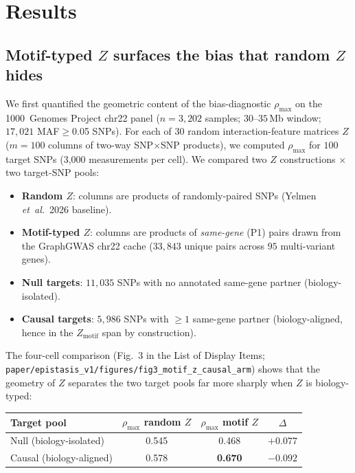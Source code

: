 \section{Results}\label{sec:results}

\subsection{Motif-typed $Z$ surfaces the bias that random $Z$ hides}\label{sec:rho_max}

We first quantified the geometric content of the bias-diagnostic
$\rho_{\max}$ on the 1000~Genomes Project chr22 panel
($n=3{,}202$ samples; $30$--$35$\,Mb window; $17{,}021$ MAF$\geq$0.05
SNPs). For each of $30$ random interaction-feature matrices $Z$
($m=100$ columns of two-way SNP$\times$SNP products), we computed
$\rho_{\max}$ for $100$ target SNPs (3{,}000 measurements per cell).
We compared two $Z$ constructions $\times$ two target-SNP pools:

\begin{itemize}
\setlength{\itemsep}{0pt}
\item \textbf{Random $Z$}: columns are products of randomly-paired SNPs
      (Yelmen \emph{et~al.}\ 2026 baseline).
\item \textbf{Motif-typed $Z$}: columns are products of \emph{same-gene} (P1)
      pairs drawn from the GraphGWAS chr22 cache
      ($33{,}843$ unique pairs across $95$ multi-variant genes).
\item \textbf{Null targets}: $11{,}035$ SNPs with no annotated same-gene
      partner (biology-isolated).
\item \textbf{Causal targets}: $5{,}986$ SNPs with $\geq 1$ same-gene
      partner (biology-aligned, hence in the $Z_{\mathrm{motif}}$ span by construction).
\end{itemize}

The four-cell comparison (Fig.~3 in the List of Display Items;
\texttt{paper/epistasis\_v1/figures/fig3\_motif\_z\_causal\_arm}) shows
that the geometry of $Z$ separates the two target pools far more sharply
when $Z$ is biology-typed:

\begin{center}\small
\begin{tabular}{lccc}
\toprule
Target pool          & $\rho_{\max}$ random $Z$ & $\rho_{\max}$ motif $Z$ & $\Delta$\\
\midrule
Null (biology-isolated) & 0.545 & 0.468 & $+0.077$\\
Causal (biology-aligned) & 0.578 & \textbf{0.670} & $-0.092$\\
\bottomrule
\end{tabular}
\end{center}

